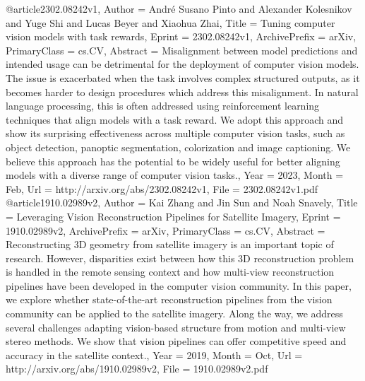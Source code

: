 @article{2302.08242v1,
Author        = {André Susano Pinto and Alexander Kolesnikov and Yuge Shi and Lucas Beyer and Xiaohua Zhai},
Title         = {Tuning computer vision models with task rewards},
Eprint        = {2302.08242v1},
ArchivePrefix = {arXiv},
PrimaryClass  = {cs.CV},
Abstract      = {Misalignment between model predictions and intended usage can be detrimental
for the deployment of computer vision models. The issue is exacerbated when the
task involves complex structured outputs, as it becomes harder to design
procedures which address this misalignment. In natural language processing,
this is often addressed using reinforcement learning techniques that align
models with a task reward. We adopt this approach and show its surprising
effectiveness across multiple computer vision tasks, such as object detection,
panoptic segmentation, colorization and image captioning. We believe this
approach has the potential to be widely useful for better aligning models with
a diverse range of computer vision tasks.},
Year          = {2023},
Month         = {Feb},
Url           = {http://arxiv.org/abs/2302.08242v1},
File          = {2302.08242v1.pdf}
}
@article{1910.02989v2,
Author        = {Kai Zhang and Jin Sun and Noah Snavely},
Title         = {Leveraging Vision Reconstruction Pipelines for Satellite Imagery},
Eprint        = {1910.02989v2},
ArchivePrefix = {arXiv},
PrimaryClass  = {cs.CV},
Abstract      = {Reconstructing 3D geometry from satellite imagery is an important topic of
research. However, disparities exist between how this 3D reconstruction problem
is handled in the remote sensing context and how multi-view reconstruction
pipelines have been developed in the computer vision community. In this paper,
we explore whether state-of-the-art reconstruction pipelines from the vision
community can be applied to the satellite imagery. Along the way, we address
several challenges adapting vision-based structure from motion and multi-view
stereo methods. We show that vision pipelines can offer competitive speed and
accuracy in the satellite context.},
Year          = {2019},
Month         = {Oct},
Url           = {http://arxiv.org/abs/1910.02989v2},
File          = {1910.02989v2.pdf}
}
